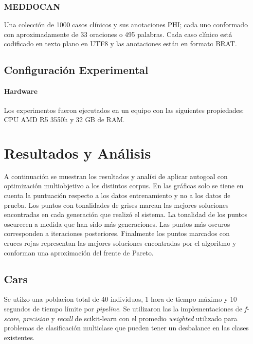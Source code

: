 \subsubsection{MEDDOCAN}

Una colecci\'on de 1000 casos cl\'inicos y sus anotaciones PHI; cada uno conformado con aproximadamente de 33 oraciones o 495 palabras. Cada caso cl\'inico est\'a codificado en texto plano en UTF8 y las anotaciones est\'an en formato BRAT.


\subsection{Configuraci\'on Experimental}

\paragraph{Hardware} Los experimentos fueron ejecutados en un equipo con las siguientes propiedades: CPU AMD R5 3550h y 32 GB de RAM.

\section{Resultados y An\'alisis}

A continuaci\'on se muestran los resultados y anal\'isi de aplicar autogoal con optimizaci\'on multiobjetivo a los distintos corpus. En las gr\'aficas solo se tiene en cuenta la puntuaci\'on respecto a los datos entrenamiento y no a los datos de prueba. Los puntos con tonalidades de grises marcan las mejores soluciones encontradas en cada generaci\'on que realiz\'o el sistema. La tonalidad de los puntos oscurecen a medida que han sido m\'as generaciones. Las puntos m\'as oscuros corresponden a iteraciones posteriores. Finalmente los puntos marcados con cruces rojas representan las mejores soluciones encontradas por el algoritmo y conforman una aproximaci\'on del frente de Pareto.

\subsection{Cars}

Se utilzo una poblacion total de 40 individuos, 1 hora de tiempo m\'aximo y 10 segundos de tiempo l\'imite por \textit{pipeline}. Se utilizaron las la implementaciones de \textit{f-score}, \textit{precision} y \textit{recall} de scikit-learn con el promedio \textit{weighted} utilizado para problemas de clasificaci\'on multiclase que pueden tener un desbalance en las clases existentes.

